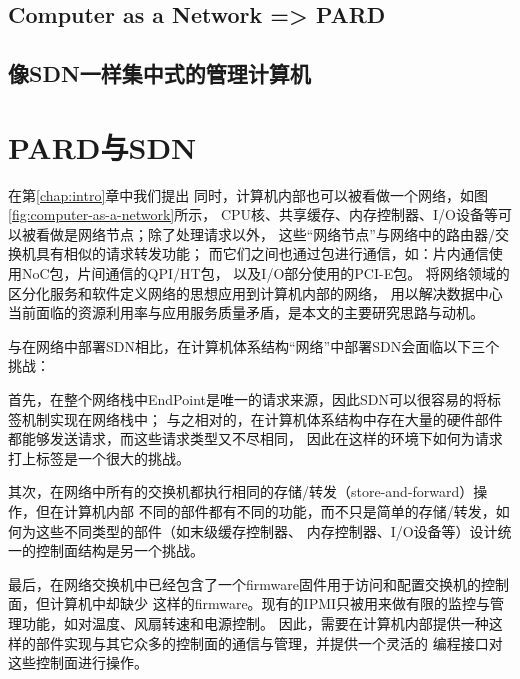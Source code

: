\subsection{Computer as a Network => PARD}

\subsection{像SDN一样集中式的管理计算机}

\section{PARD与SDN}

在第\ref{chap:intro}章中我们提出
同时，计算机内部也可以被看做一个网络，如图\ref{fig:computer-as-a-network}所示，
CPU核、共享缓存、内存控制器、I/O设备等可以被看做是网络节点；除了处理请求以外，
这些“网络节点”与网络中的路由器/交换机具有相似的请求转发功能；
而它们之间也通过包进行通信，如：片内通信使用NoC包，片间通信的QPI/HT包，
以及I/O部分使用的PCI-E包。
将网络领域的区分化服务和软件定义网络的思想应用到计算机内部的网络，
用以解决数据中心当前面临的资源利用率与应用服务质量矛盾，是本文的主要研究思路与动机。

与在网络中部署SDN相比，在计算机体系结构“网络”中部署SDN会面临以下三个挑战：

首先，在整个网络栈中EndPoint是唯一的请求来源，因此SDN可以很容易的将标签机制实现在网络栈中；
与之相对的，在计算机体系结构中存在大量的硬件部件都能够发送请求，而这些请求类型又不尽相同，
因此在这样的环境下如何为请求打上标签是一个很大的挑战。

其次，在网络中所有的交换机都执行相同的存储/转发（store-and-forward）操作，但在计算机内部
不同的部件都有不同的功能，而不只是简单的存储/转发，如何为这些不同类型的部件（如末级缓存控制器、
内存控制器、I/O设备等）设计统一的控制面结构是另一个挑战。

最后，在网络交换机中已经包含了一个firmware固件用于访问和配置交换机的控制面，但计算机中却缺少
这样的firmware。现有的IPMI只被用来做有限的监控与管理功能，如对温度、风扇转速和电源控制。
因此，需要在计算机内部提供一种这样的部件实现与其它众多的控制面的通信与管理，并提供一个灵活的
编程接口对这些控制面进行操作。

\fi
